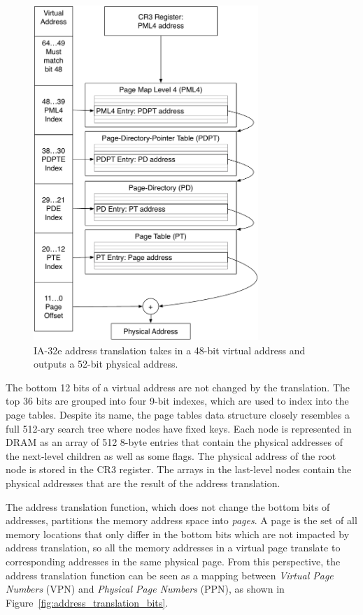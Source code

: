 \begin{figure}[hbt]
  \centering
  \includegraphics[width=85mm]{figures/os_paging.pdf}
  \caption{
    IA-32e address translation takes in a 48-bit virtual address and outputs
    a 52-bit physical address.
  }
  \label{fig:os_paging}
\end{figure}

The bottom 12 bits of a virtual address are not changed by the translation. The
top 36 bits are grouped into four 9-bit indexes, which are used to index into
the page tables. Despite its name, the page tables data structure closely
resembles a full 512-ary search tree where nodes have fixed keys. Each
node is represented in DRAM as an array of 512 8-byte entries that contain the
physical addresses of the next-level children as well as some flags. The
physical address of the root node is stored in the CR3 register. The arrays in
the last-level nodes contain the physical addresses that are the result of the
address translation.

The address translation function, which does not change the bottom bits of
addresses, partitions the memory address space into \textit{pages}. A page is
the set of all memory locations that only differ in the bottom bits which are
not impacted by address translation, so all the memory addresses in a virtual
page translate to corresponding addresses in the same physical page. From this
perspective, the address translation function can be seen as a mapping between
\textit{Virtual Page Numbers} (VPN) and \textit{Physical Page Numbers} (PPN),
as shown in Figure~\ref{fig:address_translation_bits}.

